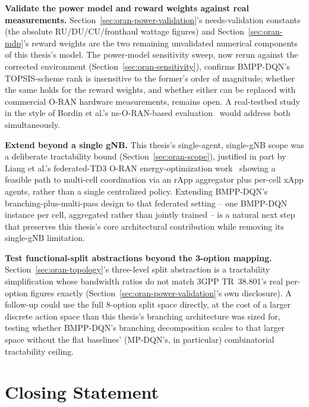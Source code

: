 \textbf{Validate the power model and reward weights against real
measurements.} Section~\ref{sec:oran-power-validation}'s needs-validation
constants (the absolute RU/DU/CU/fronthaul wattage figures) and
Section~\ref{sec:oran-mdp}'s reward weights are the two remaining
unvalidated numerical components of this thesis's model. The power-model
sensitivity sweep, now rerun against the corrected environment
(Section~\ref{sec:oran-sensitivity}), confirms BMPP-DQN's TOPSIS-scheme
rank is insensitive to the former's order of magnitude; whether the same
holds for the reward weights, and whether either can be replaced with
commercial O-RAN hardware measurements, remains open. A real-testbed
study in the style of Bordin et al.'s ns-O-RAN-based
evaluation~\cite{bordin2025design} would address both simultaneously.

\textbf{Extend beyond a single gNB.} This thesis's single-agent,
single-gNB scope was a deliberate tractability bound
(Section~\ref{sec:oran-scope}), justified in part by Liang et al.'s
federated-TD3 O-RAN energy-optimization work~\cite{liang2026federated}
showing a feasible path to multi-cell coordination via an rApp
aggregator plus per-cell xApp agents, rather than a single centralized
policy. Extending BMPP-DQN's branching-plus-multi-pass design to that
federated setting -- one BMPP-DQN instance per cell, aggregated rather than
jointly trained -- is a natural next step that preserves this thesis's core
architectural contribution while removing its single-gNB limitation.

\textbf{Test functional-split abstractions beyond the 3-option mapping.}
Section~\ref{sec:oran-topology}'s three-level split abstraction is a
tractability simplification whose bandwidth ratios do not match 3GPP
TR~38.801's real per-option figures exactly
(Section~\ref{sec:oran-power-validation}'s own disclosure). A follow-up
could use the full 8-option split space directly, at the cost of a larger
discrete action space than this thesis's branching architecture was sized
for, testing whether BMPP-DQN's branching decomposition scales to that
larger space without the flat baselines' (MP-DQN's, in particular)
combinatorial tractability ceiling.

\section{Closing Statement}
\label{sec:oran-closing}

